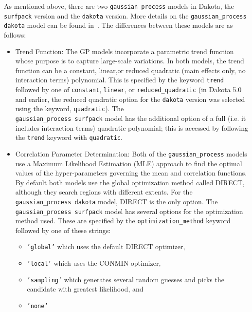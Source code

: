 As mentioned above, there are two \texttt{gaussian\_process} models 
in Dakota, the \texttt{surfpack} version and the \texttt{dakota}
version.  More details on the \texttt{gaussian\_process dakota}
model can be found in~\cite{McF08}. The differences between these 
models are as follows: 

\begin{itemize}
\item Trend Function:  The GP models incorporate a parametric trend 
      function whose purpose is to capture large-scale variations. In 
      both models, the trend function can be a constant, linear,or 
      reduced quadratic (main effects only, no interaction terms) 
      polynomial.  This is specified by the keyword \texttt{trend}
      followed by one of \texttt{constant}, \texttt{linear}, or 
      \texttt{reduced\_quadratic} (in Dakota 5.0 and earlier, the reduced 
      quadratic option for the \texttt{dakota} version was selected using 
      the keyword, \texttt{quadratic}). The \\
      \texttt{gaussian\_process surfpack} model has the additional option 
      of a full (i.e. it includes interaction terms) quadratic polynomial; 
      this is accessed by following the \texttt{trend} keyword with 
      \texttt{quadratic}.
\item Correlation Parameter Determination: Both of the 
      \texttt{gaussian\_process} models use a Maximum Likelihood Estimation 
      (MLE) approach to find the optimal values of the hyper-parameters 
      governing the mean and correlation functions. By default both models 
      use the global optimization method called DIRECT, although they search 
      regions with different extents. For the 
      \texttt{gaussian\_process dakota} model, DIRECT is the only option.  
      The \texttt{gaussian\_process surfpack} model has several options for 
      the optimization method used.  These are specified by the 
      \texttt{optimization\_method} keyword followed by one of these strings:
      \begin{itemize}
      \item \texttt{'global'} which uses the default DIRECT optimizer,
      \item \texttt{'local'} which uses the CONMIN optimizer,
      \item \texttt{'sampling'} which generates several random guesses and 
            picks the candidate with greatest likelihood, and
      \item \texttt{'none'} 
      \end{itemize} 

\end{itemize}
